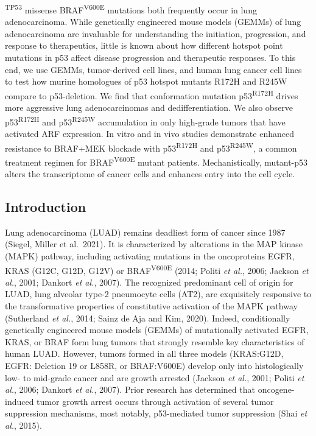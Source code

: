\textsuperscript{TP53} missense BRAF\textsuperscript{V600E} mutations both frequently occur in lung adenocarcinoma. While genetically engineered mouse models (GEMMs) of lung adenocarcinoma are invaluable for understanding the initiation, progression, and response to therapeutics, little is known about how different hotspot point mutations in p53 affect disease progression and therapeutic responses. To this end, we use GEMMs, tumor-derived cell lines, and human lung cancer cell lines to test how murine homologues of p53 hotspot mutants R172H and R245W compare to p53-deletion. We find that conformation mutation p53\textsuperscript{R172H} drives more aggressive lung adenocarcinomas and dedifferentiation. We also observe p53\textsuperscript{R172H} and p53\textsuperscript{R245W} accumulation in only high-grade tumors that have activated ARF expression. In vitro and in vivo studies demonstrate enhanced resistance to BRAF+MEK blockade with p53\textsuperscript{R172H} and p53\textsuperscript{R245W}, a common treatment regimen for BRAF\textsuperscript{V600E} mutant patients. Mechanistically, mutant-p53 alters the transcriptome of cancer cells and enhances entry into the cell cycle.

\hypertarget{introduction}{%
\subsection{Introduction}\label{introduction}}

Lung adenocarcinoma (LUAD) remains deadliest form of cancer since 1987 (Siegel, Miller et al.~2021). It is characterized by alterations in the MAP kinase (MAPK) pathway, including activating mutations in the oncoproteins EGFR, KRAS (G12C, G12D, G12V) or BRAF\textsuperscript{V600E} (2014; Politi \emph{et al.}, 2006; Jackson \emph{et al.}, 2001; Dankort \emph{et al.}, 2007). The recognized predominant cell of origin for LUAD, lung alveolar type-2 pneumocyte cells (AT2), are exquisitely responsive to the transformative properties of constitutive activation of the MAPK pathway (Sutherland \emph{et al.}, 2014; Sainz de Aja and Kim, 2020). Indeed, conditionally genetically engineered mouse models (GEMMs) of mutationally activated EGFR, KRAS, or BRAF form lung tumors that strongly resemble key characteristics of human LUAD. However, tumors formed in all three models (KRAS:G12D, EGFR: Deletion 19 or L858R, or BRAF:V600E) develop only into histologically low- to mid-grade cancer and are growth arrested (Jackson \emph{et al.}, 2001; Politi \emph{et al.}, 2006; Dankort \emph{et al.}, 2007). Prior research has determined that oncogene-induced tumor growth arrest occurs through activation of several tumor suppression mechanisms, most notably, p53-mediated tumor suppression (Shai \emph{et al.}, 2015).

